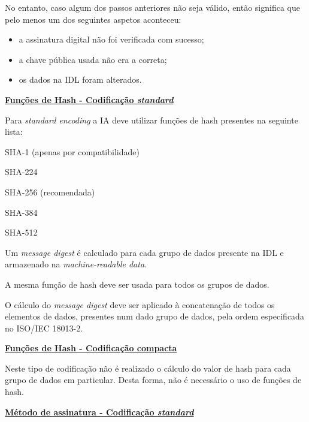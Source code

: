 No entanto, caso algum dos passos anteriores não seja válido, então significa
que pelo menos um dos seguintes aspetos aconteceu:
\begin{itemize}
    \setlength\itemsep{0.1em}
    \item a assinatura digital não foi verificada com sucesso;
    \item a chave pública usada não era a correta;
    \item os dados na IDL foram alterados.
\end{itemize}


\vspace{0.4cm}
\underline{\textbf{Funções de Hash - Codificação \emph{standard}}}
\vspace{0.3cm}

Para \emph{standard encoding} a IA deve utilizar funções de hash presentes na
seguinte lista:
\begin{itemize}
    \begin{multicols}{2}
        \item SHA-1 (apenas por compatibilidade)
        \item SHA-224
        \item SHA-256 (recomendada)
        \item SHA-384
        \item SHA-512
    \end{multicols}
\end{itemize}

Um \emph{message digest} é calculado para cada grupo de dados presente na IDL e
armazenado na \emph{machine-readable data}.

A mesma função de hash deve ser usada para todos os grupos de dados.

O cálculo do \emph{message digest} deve ser aplicado à concatenação de todos os
elementos de dados, presentes num dado grupo de dados, pela ordem
especificada no ISO/IEC 18013-2.


\vspace{0.6cm}
\underline{\textbf{Funções de Hash - Codificação compacta}}
\vspace{0.3cm}

Neste tipo de codificação não é realizado o cálculo do valor de hash para
cada grupo de dados em particular. Desta forma, não é necessário o uso de
funções de hash.


\vspace{0.6cm}
\underline{\textbf{Método de assinatura - Codificação \emph{standard}}}
\vspace{0.3cm}

